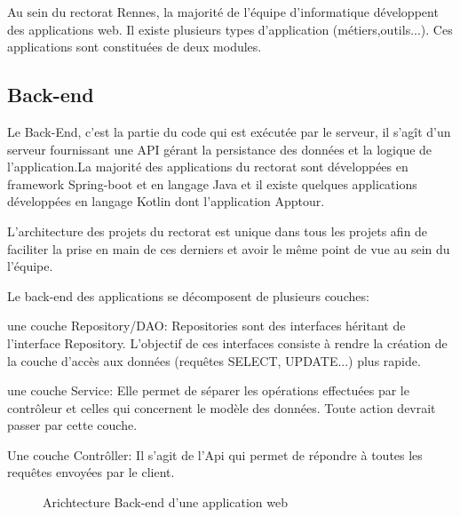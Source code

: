 \documentclass[a4paper]{article}
\begin{document}
Au sein du rectorat Rennes, la majorité de l'équipe d'informatique  développent des applications web. Il existe plusieurs types d'application (métiers,outils...). Ces applications sont constituées de deux modules. 

\subsection{Back-end}

Le Back-End, c’est la partie du code qui est exécutée par le serveur, il s’agît d'un serveur fournissant une API gérant la persistance des données et la logique de l'application.La majorité des applications du rectorat sont développées en framework Spring-boot et en langage Java et il existe quelques applications développées en langage Kotlin dont l'application Apptour.

L'architecture des projets du rectorat est unique dans tous les projets afin  de faciliter la prise en main de ces derniers et avoir le même point de vue au sein du l'équipe.

Le back-end des applications se décomposent de plusieurs couches: 

une couche Repository/DAO: Repositories sont des interfaces héritant de l'interface Repository. L'objectif de ces interfaces consiste à rendre la création de la couche d'accès aux données (requêtes SELECT, UPDATE...) plus rapide.

une couche Service: Elle permet de séparer les opérations effectuées par le contrôleur et celles qui concernent le modèle des données. Toute action devrait passer par cette couche.

Une couche Contrôller: Il s'agit de l'Api qui permet de répondre à toutes les requêtes envoyées par le client. 

\begin{figure}[H]
	\centering
  		\caption{Arichtecture Back-end d'une application web}
	\end{figure}
\end{document}
